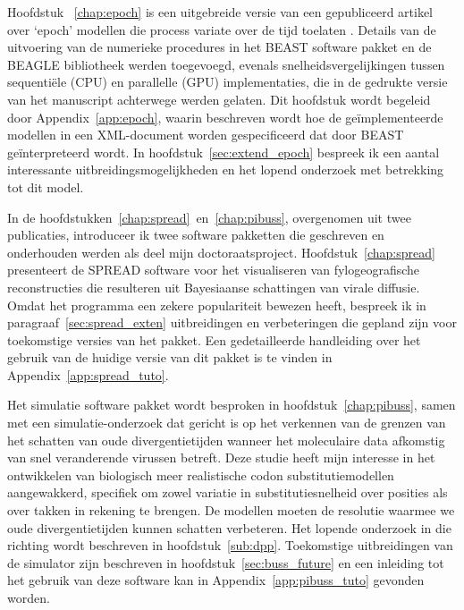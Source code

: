 {Hoofdstuk ~\ref{chap:epoch} is een uitgebreide versie van een gepubliceerd artikel over `epoch' modellen die process variate over de tijd toelaten \citep{Bielejec2014a}.
Details van de uitvoering van de numerieke procedures in het BEAST software pakket en de BEAGLE bibliotheek werden toegevoegd, evenals snelheidsvergelijkingen tussen sequenti\"ele (CPU) en parallelle (GPU) implementaties, die in de gedrukte versie van het manuscript achterwege werden gelaten.
Dit hoofdstuk wordt begeleid door Appendix~\ref{app:epoch}, waarin beschreven wordt hoe de ge\"implementeerde modellen in een XML-document worden gespecificeerd dat door BEAST ge\"interpreteerd wordt.
In hoofdstuk~\ref{sec:extend_epoch} bespreek ik een aantal interessante uitbreidingsmogelijkheden en het lopend onderzoek met betrekking tot dit model.

In de hoofdstukken~\ref{chap:spread}~en~\ref{chap:pibuss}, overgenomen uit twee publicaties, introduceer ik twee software pakketten die geschreven en onderhouden werden als deel mijn doctoraatsproject.
Hoofdstuk~\ref{chap:spread} presenteert de SPREAD software voor het visualiseren van fylogeografische reconstructies die resulteren uit Bayesiaanse schattingen van virale diffusie.
Omdat het programma een zekere populariteit bewezen heeft, bespreek ik in paragraaf~\ref{sec:spread_exten} uitbreidingen en verbeteringen die  gepland zijn voor toekomstige versies van het pakket.
Een gedetailleerde handleiding over het gebruik van de huidige versie van dit pakket is te vinden in Appendix~\ref{app:spread_tuto}.

Het simulatie software pakket {\bussname} wordt besproken in hoofdstuk~\ref{chap:pibuss}, samen met een simulatie-onderzoek dat gericht is op het verkennen van de grenzen van het schatten van oude divergentietijden wanneer het moleculaire data afkomstig van snel veranderende virussen betreft.
Deze studie heeft mijn interesse in het ontwikkelen van biologisch meer realistische codon substitutiemodellen aangewakkerd, specifiek om zowel variatie in substitutiesnelheid over posities als over takken in rekening te brengen.
De modellen moeten de resolutie waarmee we oude divergentietijden kunnen schatten verbeteren. %
Het lopende onderzoek in die richting wordt beschreven in hoofdstuk~\ref{sub:dpp}.
Toekomstige uitbreidingen van de {\bussname} simulator zijn beschreven in hoofdstuk~\ref{sec:buss_future} en een inleiding tot het gebruik van deze software kan in Appendix~\ref{app:pibuss_tuto} gevonden worden.

}
